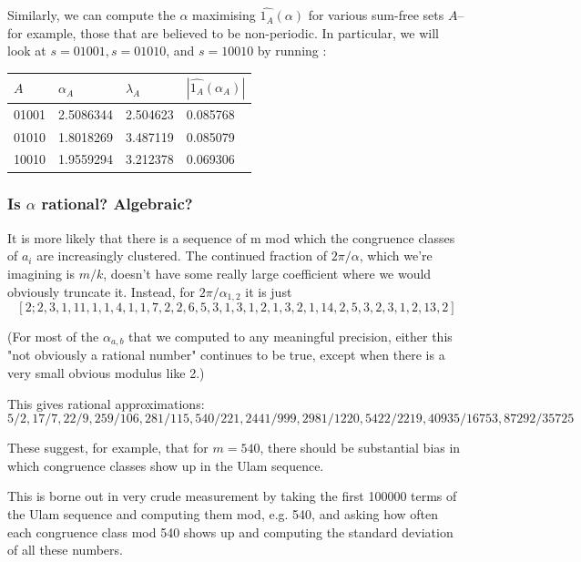 \documentclass{article}
\theoremstyle{definition}
\theoremstyle{remark}
\numberwithin{equation}{section}
\begin{document}
Similarly, we can compute the $\alpha$ maximising
$\widehat{1_A}(\alpha)$ for various sum-free sets $A$--for example,
those that are believed to be non-periodic.  In particular, we will
look at $s = 01001, s = 01010$, and $s = 10010$ by running
:

\begin{tabular}{|llll|}
\hline
$A$ & $\alpha_{A}$ & $\lambda_{A}$ & $|\widehat{1_A}(\alpha_{A})|$\\
\hline
01001 & 2.5086344 & 2.504623 & 0.085768\\
01010 & 1.8018269 & 3.487119 & 0.085079\\
10010 & 1.9559294 & 3.212378 & 0.069306\\
\hline
\end{tabular}

{\color{red}
\subsubsection{Is $\alpha$ rational?  Algebraic?}

It is more likely that there is a sequence of m mod which the
congruence classes of $a_i$ are increasingly clustered.  The continued
fraction of $2\pi/\alpha$, which we're imagining is $m/k$, doesn't have some
really large coefficient where we would obviously truncate it.
Instead, for $2\pi/\alpha_{1,2}$ it is just
\[[2; 2, 3, 1, 11, 1, 1, 4, 1, 1, 7, 2, 2, 6, 5, 3, 1, 3, 1, 2, 1, 3, 2, 1, 14, 2, 5, 3, 2, 3, 1, 2, 13, 2]\]

(For most of the $\alpha_{a,b}$ that we computed to any meaningful
precision, either this "not obviously a rational number" continues to
be true, except when there is a very small obvious modulus like 2.)

This gives rational approximations: 
\[5/2, 17/7, 22/9, 259/106, 281/115, 540/221, 2441/999, 2981/1220, 5422/2219, 40935/16753, 87292/35725\]



These suggest, for example, that for $m = 540$, there should be
substantial bias in which congruence classes show up in the Ulam
sequence.

This is borne out in very crude measurement by taking the first
100000 terms of the Ulam sequence and computing them mod, e.g. 540, and
asking how often each congruence class mod 540 shows up and computing
the standard deviation of all these numbers.


}
\end{document}
